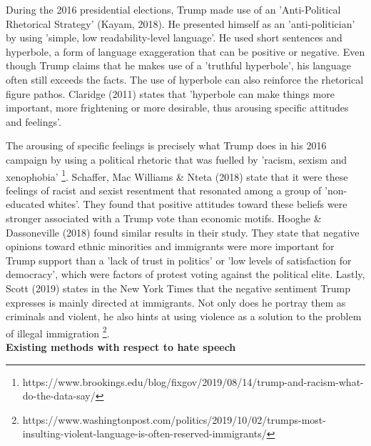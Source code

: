 \documentclass[a4paper,pdf]{article} %
\begin{document}

During the 2016 presidential elections, Trump made use of an 'Anti-Political Rhetorical Strategy' (Kayam, 2018). He presented himself as an 'anti-politician' by using 'simple, low readability-level language'. He used short sentences and hyperbole, a form of language exaggeration that can be positive or negative. Even though Trump claims that he makes use of a 'truthful hyperbole', his language often still exceeds the facts. The use of hyperbole can also reinforce the rhetorical figure pathos. Claridge (2011) states that 'hyperbole can make things more important, more frightening or more desirable, thus arousing specific attitudes and feelings'. 

The arousing of specific feelings is precisely what Trump does in his 2016 campaign by using a political rhetoric that was fuelled by 'racism, sexism and xenophobia' \footnote{https://www.brookings.edu/blog/fixgov/2019/08/14/trump-and-racism-what-do-the-data-say/}. Schaffer, Mac Williams \& Nteta (2018) state that it were these feelings of racist and sexist resentment that resonated among a group of 'non-educated whites'. They found that positive attitudes toward these beliefs were stronger associated with a Trump vote than economic motifs. Hooghe \& Dassoneville (2018) found similar results in their study. They state that negative opinions toward ethnic minorities and immigrants were more important for Trump support than a 'lack of trust in politics' or 'low levels of satisfaction for democracy', which were factors of protest voting against the political elite. Lastly, Scott (2019) states in the New York Times that the negative sentiment Trump expresses is mainly directed at immigrants. Not only does he portray them as criminals and violent, he also hints at using violence as a solution to the problem of illegal immigration \footnote{https://www.washingtonpost.com/politics/2019/10/02/trumps-most-insulting-violent-language-is-often-reserved-immigrants/}.\\

\textbf{Existing methods with respect to hate speech}\\
\end{document}
